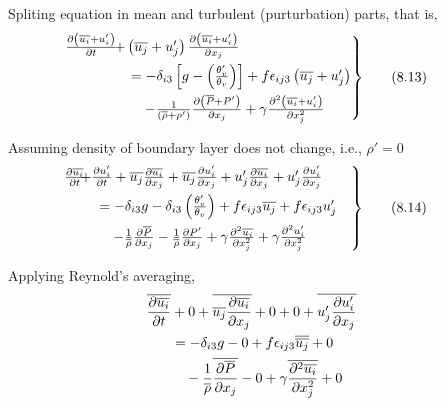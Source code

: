 \documentclass[fleqn,10pt]{SelfArx} %
\begin{document}
Spliting equation in mean and turbulent (purturbation) parts, that is,
\begin{align*}
	\begin{rcases}
		\mspace{-20mu} \frac{\partial\left(\overline{u_i} + u_i'\right)}{\partial t} & \!\!\!\!\!\!\! + \left(\overline{u_j} + u_j' \right)\frac{\partial \left(\overline{u_i} + u_i'\right)}{\partial x_j} \\ &= -\delta_{i3}\left[g - \left(\frac{\theta_v'}{\theta_v}\right)\right] + f \epsilon_{ij3}\left(\overline{u_j} + u_j'\right) \\ &\quad -\frac{1}{\left(\overline{\rho} + \rho'\right)}\frac{\partial \left(\overline{P} + P'\right)}{\partial x_j} + \gamma\frac{\partial^2 \left(\overline{u_i} + u_i'\right)}{\partial x_j^2}
	\end{rcases} & \tag{8.13} \label{eq:8.13}
\end{align*}

Assuming density of boundary layer does not change, i.e., $\rho' = 0$
\begin{align*}
	\begin{rcases}
		\mspace{-20mu} \frac{\partial \overline{u_i}}{\partial t} & \!\!\!\!\!\!\!\! + \frac{\partial u_i'}{\partial t} + \overline{u_j}\frac{\partial \overline{u_i}}{\partial x_j} +\overline{u_j}\frac{\partial u_i'}{\partial x_j} + u_j'\frac{\partial \overline{u_i}}{\partial x_j} + u_j'\frac{\partial u_i'}{\partial x_j} \\
		&= -\delta_{i3}g - \delta_{i3}\left(\frac{\theta_v'}{\theta_v}\right) + f \epsilon_{ij3}\overline{u_j} + f \epsilon_{ij3} u_j'  \quad \\
		&\quad - \frac{1}{\overline{\rho}}\frac{\partial\overline{P}}{\partial x_j} - \frac{1}{\overline{\rho}}\frac{\partial P'}{\partial x_j} + \gamma\frac{\partial^2 \overline{u_i}}{\partial x_j^2} + \gamma\frac{\partial^2 u_i'}{\partial x_j^2}
	\end{rcases} & \tag{8.14} \label{eq:8.14}
\end{align*}

Applying Reynold's averaging,
\begin{align*}
	\mspace{-20mu} \overline{\frac{\partial \overline{u_i}}{\partial t}} &+ 0 + \overline{\overline{u_j}\frac{\partial \overline{u_i}}{\partial x_j}} + 0 + 0 + \overline{u_j'\frac{\partial u_i'}{\partial x_j}} \\ 
	&= -\delta_{i3}g - 0 + f \epsilon_{ij3}\overline{\overline{u_j}} + 0 \\ 
	&\quad - \frac{1}{\overline{\rho}}\overline{\frac{\partial\overline{P}}{\partial x_j}} - 0 + \gamma\overline{\frac{\partial^2 \overline{u_i}}{\partial x_j^2}} + 0
\end{align*}
\end{document}
